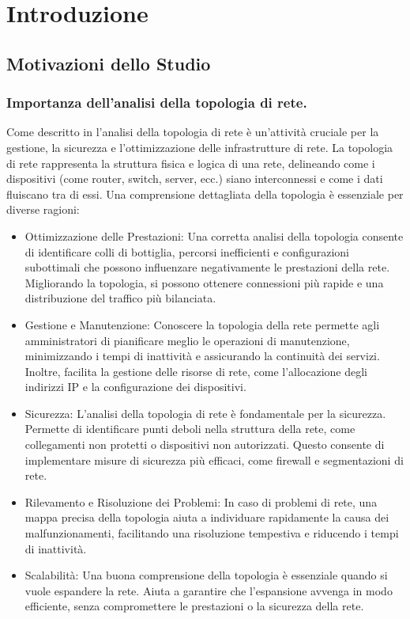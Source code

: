 \documentclass[target=bach,aauheader=,style=]{thud}
\begin{document}
\chapter{Introduzione}
\section{Motivazioni dello Studio}
\subsection{Importanza dell'analisi della topologia di rete.}
Come descritto in \cite{tanenbaum2011computer} l'analisi della topologia di rete è un'attività cruciale per la gestione, la sicurezza e l'ottimizzazione delle infrastrutture di rete. La topologia di rete rappresenta la struttura fisica e logica di una rete, delineando come i dispositivi (come router, switch, server, ecc.) siano interconnessi e come i dati fluiscano tra di essi. Una comprensione dettagliata della topologia è essenziale per diverse ragioni:
\begin{itemize}
  \item Ottimizzazione delle Prestazioni: Una corretta analisi della topologia consente di identificare colli di bottiglia, percorsi inefficienti e configurazioni subottimali che possono influenzare negativamente le prestazioni della rete. Migliorando la topologia, si possono ottenere connessioni più rapide e una distribuzione del traffico più bilanciata.
  \item Gestione e Manutenzione: Conoscere la topologia della rete permette agli amministratori di pianificare meglio le operazioni di manutenzione, minimizzando i tempi di inattività e assicurando la continuità dei servizi. Inoltre, facilita la gestione delle risorse di rete, come l'allocazione degli indirizzi IP e la configurazione dei dispositivi.
  \item Sicurezza: L'analisi della topologia di rete è fondamentale per la sicurezza. Permette di identificare punti deboli nella struttura della rete, come collegamenti non protetti o dispositivi non autorizzati. Questo consente di implementare misure di sicurezza più efficaci, come firewall e segmentazioni di rete.
  \item Rilevamento e Risoluzione dei Problemi: In caso di problemi di rete, una mappa precisa della topologia aiuta a individuare rapidamente la causa dei malfunzionamenti, facilitando una risoluzione tempestiva e riducendo i tempi di inattività.
  \item Scalabilità: Una buona comprensione della topologia è essenziale quando si vuole espandere la rete. Aiuta a garantire che l'espansione avvenga in modo efficiente, senza compromettere le prestazioni o la sicurezza della rete.
\end{itemize}
\end{document}
